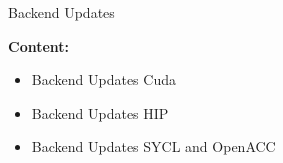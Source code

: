 

\begin{frame}[fragile]

  {\Huge Backend Updates}

  \vspace{10pt}

  \textbf{Content:}
  \begin{itemize}
    \item Backend Updates Cuda
    \item Backend Updates HIP
    \item Backend Updates SYCL and OpenACC
  \end{itemize}

\end{frame}


